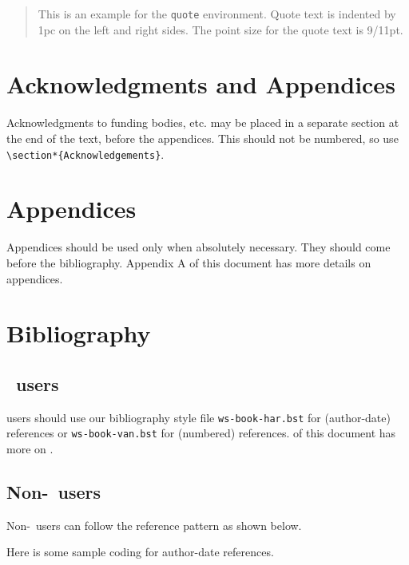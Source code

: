 \begin{quote}
This is an example for the \verb|quote| environment. Quote text is
indented by 1pc on the left and right sides. The point size for the
quote text is 9/11pt.
\end{quote}

\section{Acknowledgments and Appendices}
Acknowledgments to funding bodies, etc. may be placed in a separate
section at the end of the text, before the appendices. This should not
be numbered, so use \verb|\section*{Acknowledgements}|.

\section{Appendices}
Appendices should be used only when absolutely necessary. They
should come before the bibliography. Appendix A of this
document has more details on appendices.

\section{Bibliography}

\subsection[BiBTeX users]{\btex\ users}

\btex\index{\btex} users should use our bibliography style file
\verb|ws-book-har.bst| for (author-date) references or
\verb|ws-book-van.bst| for (numbered) references.  of this
document has more on \btex.

\subsection[Non-BiBTeX users]{Non-\btex\ users}
Non-\btex\ users can follow the reference pattern as shown below.

Here is some sample coding for author-date references.

